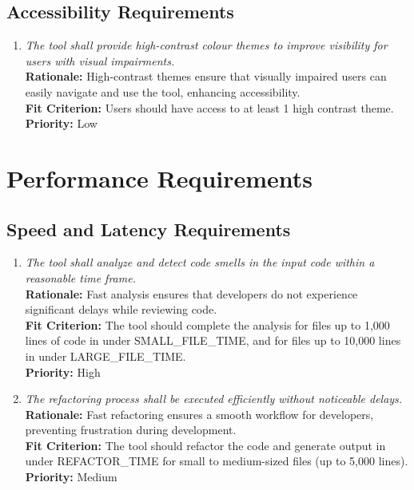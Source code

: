 \documentclass[12pt]{article}
\begin{document}
\subsection{Accessibility Requirements}
\begin{enumerate}[label=UHR-ACS \arabic*., wide=0pt, leftmargin=*]
  \item \emph{The tool shall provide high-contrast colour themes to
    improve visibility for users with visual impairments.}\\[2mm]
    {\bf Rationale:} High-contrast themes ensure that visually
    impaired users can easily navigate and use the tool, enhancing
    accessibility.\\
    {\bf Fit Criterion:} Users should have access to at least 1 high
    contrast theme.\\
    {\bf Priority:} Low
\end{enumerate}

\section{Performance Requirements}
\subsection{Speed and Latency Requirements}
\begin{enumerate}[label=PR-SL \arabic*., wide=0pt, leftmargin=*]
  \item \emph{The tool shall analyze and detect code smells in the
    input code within a reasonable time frame.}\\[2mm]
    {\bf Rationale:} Fast analysis ensures that developers do not
    experience significant delays while reviewing code.\\
    {\bf Fit Criterion:} The tool should complete the analysis for
    files up to 1,000 lines of code in under SMALL\_FILE\_TIME, and
    for files up to 10,000 lines in under LARGE\_FILE\_TIME.\\
    {\bf Priority:} High
  \item \emph{The refactoring process shall be executed efficiently
    without noticeable delays.}\\[2mm]
    {\bf Rationale:} Fast refactoring ensures a smooth workflow for
    developers, preventing frustration during development.\\
    {\bf Fit Criterion:} The tool should refactor the code and
    generate output in under REFACTOR\_TIME for small to medium-sized
    files (up to 5,000 lines).\\
    {\bf Priority:} Medium
\end{enumerate}
\end{document}
